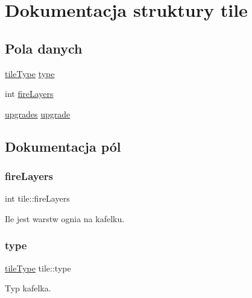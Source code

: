 \hypertarget{structtile}{}\section{Dokumentacja struktury tile}
\label{structtile}
\subsection*{Pola danych}
\begin{DoxyCompactItemize}
\item 
\mbox{\hyperlink{enums_structs_macros_8h_adca33e9a9e3b9e5360ac3dfe76bc2257}{tile\+Type}} \mbox{\hyperlink{structtile_a2f72cb93888f4c4a2b5f6511e59bf30c}{type}}
\item 
int \mbox{\hyperlink{structtile_adbd8c4a7697c3133b3d2cf9d8c3698e1}{fire\+Layers}}
\item 
\mbox{\hyperlink{enums_structs_macros_8h_a309b25f23fe120468075b0bf109cc4a2}{upgrades}} \mbox{\hyperlink{structtile_ae8518df60928fa8c04dc24338ff9fc83}{upgrade}}
\end{DoxyCompactItemize}


\subsection{Dokumentacja pól}
\mbox{\label{structtile_adbd8c4a7697c3133b3d2cf9d8c3698e1}} 
\subsubsection{\texorpdfstring{fire\+Layers}{fireLayers}}
{\footnotesize\ttfamily int tile\+::fire\+Layers}

Ile jest warstw ognia na kafelku. \mbox{\label{structtile_a2f72cb93888f4c4a2b5f6511e59bf30c}} 
\subsubsection{\texorpdfstring{type}{type}}
{\footnotesize\ttfamily \mbox{\hyperlink{enums_structs_macros_8h_adca33e9a9e3b9e5360ac3dfe76bc2257}{tile\+Type}} tile\+::type}

Typ kafelka. \mbox{\label{structtile_ae8518df60928fa8c04dc24338ff9fc83}} 
